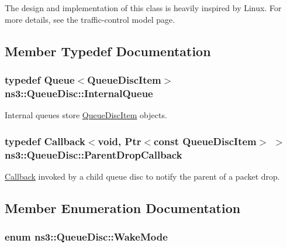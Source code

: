 The design and implementation of this class is heavily inspired by Linux. For more details, see the traffic-\/control model page. 

\subsection{Member Typedef Documentation}
\subsubsection[{\texorpdfstring{Internal\+Queue}{InternalQueue}}]{\setlength{\rightskip}{0pt plus 5cm}typedef {\bf Queue}$<${\bf Queue\+Disc\+Item}$>$ {\bf ns3\+::\+Queue\+Disc\+::\+Internal\+Queue}}\hypertarget{classns3_1_1QueueDisc_a3acb7d460465f9f13c6fbbdeae7508f8}{}\label{classns3_1_1QueueDisc_a3acb7d460465f9f13c6fbbdeae7508f8}


Internal queues store \hyperlink{classns3_1_1QueueDiscItem}{Queue\+Disc\+Item} objects. 

\subsubsection[{\texorpdfstring{Parent\+Drop\+Callback}{ParentDropCallback}}]{\setlength{\rightskip}{0pt plus 5cm}typedef {\bf Callback}$<$void, {\bf Ptr}$<$const {\bf Queue\+Disc\+Item}$>$ $>$ {\bf ns3\+::\+Queue\+Disc\+::\+Parent\+Drop\+Callback}}\hypertarget{classns3_1_1QueueDisc_abcb41646ec54f8206bc14df2c93762f4}{}\label{classns3_1_1QueueDisc_abcb41646ec54f8206bc14df2c93762f4}


\hyperlink{classns3_1_1Callback}{Callback} invoked by a child queue disc to notify the parent of a packet drop. 



\subsection{Member Enumeration Documentation}
\subsubsection[{\texorpdfstring{Wake\+Mode}{WakeMode}}]{\setlength{\rightskip}{0pt plus 5cm}enum {\bf ns3\+::\+Queue\+Disc\+::\+Wake\+Mode}}\hypertarget{classns3_1_1QueueDisc_a0b9b32e71d5becf66e6ac4b3d3de7c8b}{}\label{classns3_1_1QueueDisc_a0b9b32e71d5becf66e6ac4b3d3de7c8b}


